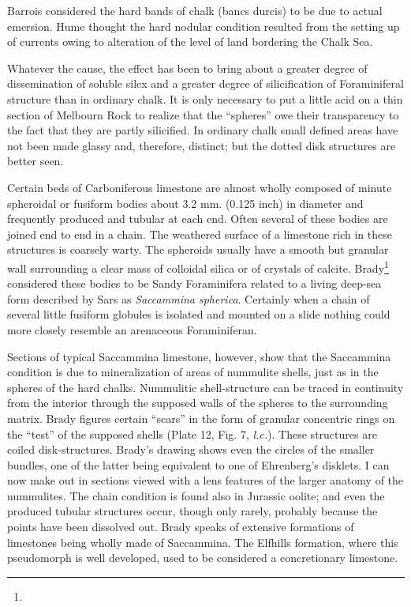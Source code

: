 \documentclass[a4paper, 12pt, oneside]{article}
\begin{document}
Barrois considered the hard bands of chalk (bancs durcis) to be due to actual emersion. Hume thought the hard nodular condition resulted from the setting up of currents owing to alteration of the level of land bordering the Chalk Sea.

Whatever the cause, the effect has been to bring about a greater degree of dissemination of soluble silex and a greater degree of silicification of Foraminiferal structure than in ordinary chalk. It is only necessary to put a little acid on a thin section of Melbourn Rock to realize that the ``spheres'' owe their transparency to the fact that they are partly silicified. In ordinary chalk small defined areas have not been made glassy and, therefore, distinct; but the dotted disk structures are better seen.

Certain beds of Carboniferous limestone are almost wholly composed of minute spheroidal or fusiform bodies about 3.2 mm. (0.125 inch) in diameter and frequently produced and tubular at each end. Often several of these bodies are joined end to end in a chain. The weathered surface of a limestone rich in these structures is coarsely warty. The spheroids usually have a smooth but granular wall surrounding a clear mass of colloidal silica or of crystals of calcite. Brady\footnote{} considered these bodies to be Sandy Foraminifera related to a living deep-sea form described by Sars as \emph{Saccammina spherica}. Certainly when a chain of several little fusiform globules is isolated and mounted on a slide nothing could more closely resemble an arenaceous Foraminiferan.

Sections of typical Saccammina limestone, however, show that the Saccammina condition is due to mineralization of areas of nummulite shells, just as in the spheres of the hard chalks. Nummulitic shell-structure can be traced in continuity from the interior through the supposed walls of the spheres to the surrounding matrix. Brady figures certain ``scars'' in the form of granular concentric rings on the ``test'' of the supposed shells (Plate 12, Fig. 7, \emph{l.c.}). These structures are coiled disk-structures. Brady's drawing shows even the circles of the smaller bundles, one of the latter being equivalent to one of Ehrenberg's disklets. I can now make out in sections viewed with a lens features of the larger anatomy of the nummulites. The chain condition is found also in Jurassic oolite; and even the produced tubular structures occur, though only rarely, probably because the points have been dissolved out. Brady speaks of extensive formations of limestones being wholly made of Saccammina. The Elfhills formation, where this pseudomorph is well developed, used to be considered a concretionary limestone.
\end{document}
